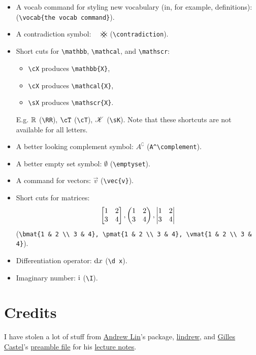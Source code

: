 \documentclass[10pt,letterpaper]{amsart}
\begin{document}
\begin{itemize}
  \item A vocab command for styling new vocabulary (in, for example, definitions):  (\verb|\vocab{the vocab command}|). 
  \item A contradiction symbol: \(\contradiction\) (\verb|\contradiction|). 
  \item Short cuts for \verb|\mathbb|, \verb|\mathcal|, and \verb|\mathscr|:
    \begin{itemize}
      \item \verb|\cX| produces \verb|\mathbb{X}|, 
      \item \verb|\cX| produces \verb|\mathcal{X}|, 
      \item \verb|\sX| produces \verb|\mathscr{X}|. 
    \end{itemize}
    E.g. \(\mathbb{R}\) (\verb|\RR|), \(\cT\) (\verb|\cT|), \(\mathscr{K}\) (\verb|\sK|). 
    Note that these shortcuts are not available for all letters. 
  \item A better looking complement symbol: \(A^\complement\) (\verb|A^\complement|).
  \item A better empty set symbol: \(\emptyset\) (\verb|\emptyset|). 
  \item A command for vectors: \(\vec{v}\) (\verb|\vec{v}|).
  \item Short cuts for matrices: \[
    \begin{bmatrix}1 & 2 \\ 3 & 4\end{bmatrix}, \begin{pmatrix}1 & 2 \\ 3 & 4\end{pmatrix}, \begin{vmatrix}1 & 2 \\ 3 & 4\end{vmatrix}
  \]
  (\verb|\bmat{1 & 2 \\ 3 & 4}, \pmat{1 & 2 \\ 3 & 4}, \vmat{1 & 2 \\ 3 & 4}|). 
  \item Differentiation operator: \(\mathrm{d} x\) (\verb|\d x|).
  \item Imaginary number: \(\mathrm{i}\) (\verb|\I|).
\end{itemize}



\section{Credits}
I have stolen a lot of stuff from \href{https://web.stanford.edu/~lindrew/}{Andrew Lin}'s package, \href{https://web.stanford.edu/~lindrew/lindrew.sty}{lindrew}, and \href{https://github.com/gillescastel}{Gilles Castel}'s \href{https://github.com/gillescastel/lecture-notes/blob/master/algebraic-topology/preamble.tex}{preamble file} for his \href{https://github.com/gillescastel/lecture-notes}{lecture notes}. 
\end{document}
